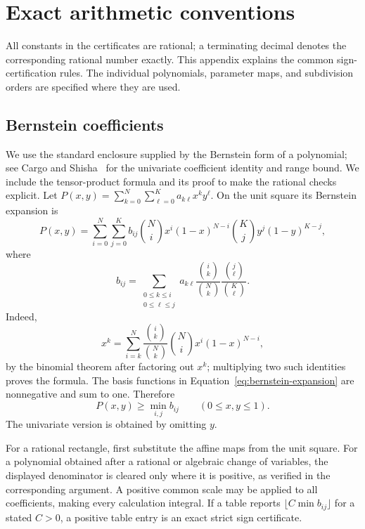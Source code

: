 \section{Exact arithmetic conventions}\label{app:arithmetic}
All constants in the certificates are rational; a terminating decimal denotes the corresponding rational number exactly.
This appendix explains the common sign-certification rules.
The individual polynomials, parameter maps, and subdivision orders are specified where they are used.

\subsection{Bernstein coefficients}
We use the standard enclosure supplied by the Bernstein form of a
polynomial; see Cargo and Shisha~\cite[Section~3]{CargoShisha66} for
the univariate coefficient identity and range bound. We include the
tensor-product formula and its proof to make the rational checks explicit.
Let \(P(x,y)=\sum_{k=0}^N\sum_{\ell=0}^K a_{k\ell}x^ky^\ell\).
On the unit square its Bernstein expansion is
\begin{equation}\label{eq:bernstein-expansion}
P(x,y)=\sum_{i=0}^N\sum_{j=0}^K b_{ij}
\binom Ni x^i(1-x)^{N-i}\binom Kj y^j(1-y)^{K-j},
\end{equation}
where
\begin{equation}\label{eq:bernstein-coefficients}
b_{ij}=
\sum_{\substack{0\le k\le i\\0\le\ell\le j}}
a_{k\ell}
\frac{\binom ik}{\binom Nk}
\frac{\binom j\ell}{\binom K\ell}.
\end{equation}
Indeed,
\[
x^k=\sum_{i=k}^N
\frac{\binom ik}{\binom Nk}\binom Ni x^i(1-x)^{N-i},
\]
by the binomial theorem after factoring out \(x^k\); multiplying two such identities proves the formula.
The basis functions in Equation~\eqref{eq:bernstein-expansion} are nonnegative and sum to one.
Therefore
\begin{equation}\label{eq:bernstein-lower}
P(x,y)\ge\min_{i,j}b_{ij}\qquad(0\le x,y\le1).
\end{equation}
The univariate version is obtained by omitting \(y\).

For a rational rectangle, first substitute the affine maps from the unit square.
For a polynomial obtained after a rational or algebraic change of variables, the displayed denominator is cleared only where it is positive, as verified in the corresponding argument.
A positive common scale may be applied to all coefficients, making every calculation integral.
If a table reports
\(\lfloor C\min b_{ij}\rfloor\) for a stated \(C>0\), a positive table entry is an exact strict sign certificate.

